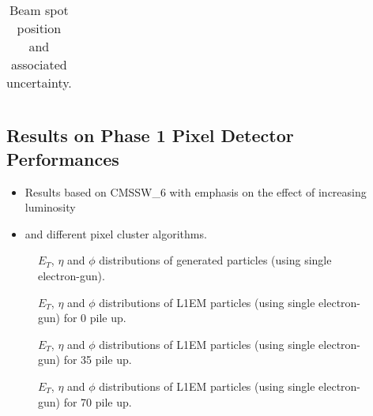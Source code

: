 \documentclass[a4paper,12pt,oneside]{article}
\begin{document}
                   \begin{table}[!htb]
                     \centering
                     \caption{Beam spot position and associated uncertainty.}
                     \label{}
                     \begin{tabular}{ccc}
                     \end{tabular}
                   \end{table}

        \subsection{Results on Phase 1 Pixel Detector Performances}

        \begin{itemize}
          \item Results based on CMSSW\_6 with emphasis on the effect of increasing luminosity
          \item and different pixel cluster algorithms.
        \end{itemize}

        \begin{figure}[!htb]
          \centering
          \caption{$E_{T}$, $\eta$ and $\phi$ distributions of generated particles (using single electron-gun).}
          \label{}
        \end{figure}

        \begin{figure}[!htb]
          \centering
          \caption{$E_{T}$, $\eta$ and $\phi$ distributions of L1EM particles (using single electron-gun) for 0 pile up.}
          \label{}
        \end{figure}

        \begin{figure}[!htb]
          \centering
          \caption{$E_{T}$, $\eta$ and $\phi$ distributions of L1EM particles (using single electron-gun) for 35 pile up.}
          \label{}
        \end{figure}

        \begin{figure}[!htb]
          \centering
          \caption{$E_{T}$, $\eta$ and $\phi$ distributions of L1EM particles (using single electron-gun) for 70 pile up.}
          \label{}
        \end{figure}
\end{document}
